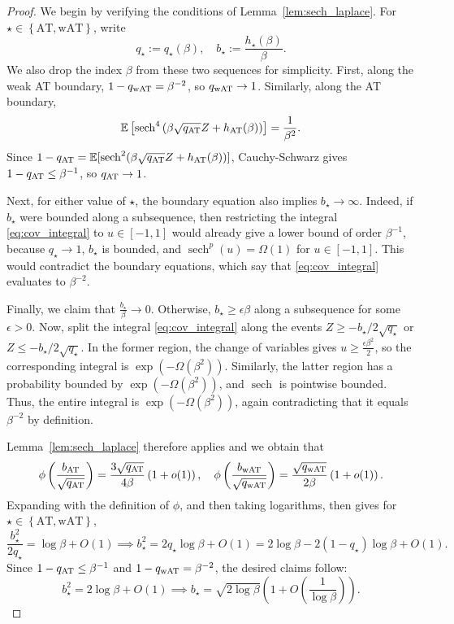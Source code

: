 \documentclass[11pt]{article}
\newcommand{\defeq}{:=}
\newcommand{\sech}{\operatorname{sech}}
\newcommand{\eps}{\epsilon}
\newcommand{\1}{\mathbf{1}}
\newcommand{\0}{\mathbf{0}}
\newcommand{\Par}[1]{\left(#1\right)}
\newcommand{\Brack}[1]{\left[#1\right]}
\newcommand{\Brace}[1]{\left\{#1\right\}}
\newcommand{\bbE}{{\mathbb{E}}}
\begin{document}
\begin{proof}
We begin by verifying the conditions of Lemma~\ref{lem:sech_laplace}. For $\star\in\Brace{\mathrm{AT},\mathrm{wAT}}$, write
\[
    q_\star\defeq q_\star(\beta),
    \quad
    b_\star\defeq \frac{h_\star(\beta)}{\beta}.
\]
We also drop the index $\beta$ from these two sequences for simplicity.
First, along the weak AT boundary,
$1-q_{\rm wAT}=\beta^{-2}$, so $q_{\rm wAT}\to1$. Similarly, along the AT boundary,
\[
    \bbE\Brack{
        \operatorname{sech}^4
        \Par{
            \beta\sqrt {q_{\rm AT}} Z+h_{\rm AT}(\beta)
        }
    }
    =
    \frac{1}{\beta^2}.
\]
Since
$1-q_{\rm AT}=\bbE[\operatorname{sech}^2(\beta\sqrt {q_{\rm AT}} Z+h_{\rm AT}(\beta))]$,
Cauchy-Schwarz gives $1-q_{\rm AT}\le\beta^{-1}$, so
$q_{\rm AT}\to1$.

Next, for either value of $\star$, the boundary equation also implies
$b_\star \to\infty$. Indeed, if $b_\star$
were bounded along a subsequence, then restricting the integral \eqref{eq:cov_integral} to
$u\in[-1,1]$ would already give a lower bound of order $\beta^{-1}$, because $q_\star \to 1$, $b_\star$ is bounded, and $\sech^p(u) = \Omega(1)$ for $u \in [-1, 1]$. This would
contradict the boundary equations, which say that \eqref{eq:cov_integral} evaluates to $\beta^{-2}$.


Finally, we claim that $\frac{b_\star}{\beta} \to0$.  Otherwise, $b_\star\ge\eps\beta$ along a subsequence
for some $\eps>0$. Now, split the integral \eqref{eq:cov_integral} along the events $Z \ge -b_\star / 2\sqrt{q_\star}$ or $Z \le -b_\star / 2\sqrt{q_\star}$. In the former region, the change of variables gives $u \ge \frac{\eps\beta^2}{2}$, so the corresponding integral is $\exp(-\Omega(\beta^2))$. Similarly, the latter region has a probability bounded by $\exp(-\Omega(\beta^2))$, and $\sech$ is pointwise bounded. Thus, the entire integral is $\exp(-\Omega(\beta^2))$, again contradicting that it equals $\beta^{-2}$ by definition.

Lemma~\ref{lem:sech_laplace} therefore applies and we obtain that 
\[
    \phi\Par{
        \frac{
            b_{\rm AT}
        }{
            \sqrt {q_{\rm AT}}
        }
    }
    =
    \frac{
        3\sqrt {q_{\rm AT}}
    }{
        4\beta
    }
    \Par{1+o(1)}, 
    \quad 
    \phi\Par{
        \frac{
            b_{\rm wAT}
        }{
            \sqrt {q_{\rm wAT}}
        }
    }
    =
    \frac{
        \sqrt {q_{\rm wAT}}
    }{
        2\beta
    }
    \Par{1+o(1)}.
\]
Expanding with the definition of $\phi$, and then taking logarithms, then gives for
$\star\in\Brace{\mathrm{AT},\mathrm{wAT}}$,
\[
    \frac{b_\star^2}{2q_\star}
    =
    \log\beta+O(1) \implies b_\star^2 = 2q_\star \log\beta + O(1) = 2\log\beta - 2(1-q_\star)\log\beta + O(1).
\]
Since $1-q_{\rm AT}\le\beta^{-1}$ and
$1-q_{\rm wAT}=\beta^{-2}$, the desired claims follow:
\[
    b_\star^2
    =
    2\log\beta+O(1) \implies
    b_\star
    =
    \sqrt{2\log\beta}
    \Par{1+O\Par{\frac{1}{\log\beta}}}.
\]
\end{proof}
\end{document}
